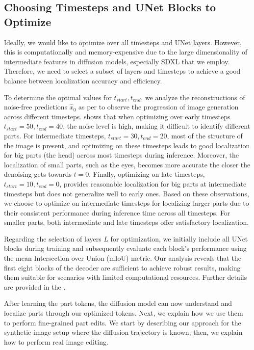 

\subsection{Choosing Timesteps and UNet Blocks to Optimize}
Ideally, we would like to optimize over all timesteps and UNet layers.
However, this is computationally and memory-expensive due to the large dimensionality of intermediate features in diffusion models, especially SDXL \citep{podell2024sdxl} that we employ.
Therefore, we need to select a subset of layers and timesteps to achieve a good balance between localization accuracy and efficiency.

To determine the optimal values for $t_{start}, t_{end}$, we analyze the reconstructions of noise-free predictions $\hat{x}_0$ as per  to observe the progression of image generation across different timesteps.
 shows that when optimizing over early timesteps $t_{start}=50, t_{end}=40$, the noise level is high, making it difficult to identify different parts.
For intermediate timesteps, $t_{start}=30, t_{end}=20$, most of the structure of the image is present, and optimizing on these timesteps leads to good localization for big parts (\eg the head) across most timesteps during inference.
Moreover, the localization of small parts, such as the eyes, becomes more accurate the closer the denoising gets towards $t=0$.
Finally, optimizing on late timesteps, $t_{start}=10, t_{end}=0$, provides reasonable localization for big parts at intermediate timesteps but does not generalize well to early ones.
Based on these observations,  we choose to optimize on intermediate timesteps for localizing larger parts due to their consistent performance during inference time across all timesteps. 
For smaller parts, both intermediate and late timesteps offer satisfactory localization.

Regarding the selection of layers $L$ for optimization, we initially include all UNet blocks during training and subsequently evaluate each block's performance using the mean Intersection over Union (mIoU) metric. 
Our analysis reveals that the first eight blocks of the decoder are sufficient to achieve robust results, making them suitable for scenarios with limited computational resources. 
Further details are provided in the .

After learning the part tokens, the diffusion model can now understand and localize parts through our optimized tokens.
Next, we explain how we use them to perform fine-grained part edits.
We start by describing our approach for the synthetic image setup where the diffusion trajectory is known; then, we explain how to perform real image editing.

